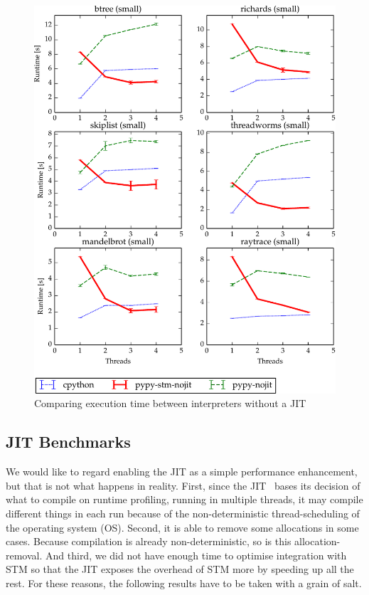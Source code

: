 \documentclass{sigplanconf}
\begin{document}
\begin{figure}[h]
  \centering
  \includegraphics[width=1\columnwidth]{plots/performance_nojit.pdf}
  \caption{Comparing execution time between interpreters without a JIT\label{fig:performance-nojit}}
\end{figure}



\subsection{JIT Benchmarks\label{subsec:jit-benchs}}

We would like to regard enabling the JIT as a simple performance
enhancement, but that is not what happens in reality. First, since the
JIT~\cite{cfbolz09} bases its decision of what to compile on runtime
profiling, running in multiple threads, it may compile different
things in each run because of the non-deterministic thread-scheduling
of the operating system (OS). Second, it is able to remove some
allocations in some cases. Because compilation is already
non-deterministic, so is this allocation-removal. And third, we did
not have enough time to optimise integration with STM so that the JIT
exposes the overhead of STM more by speeding up all the rest.
For these reasons, the following results have to be taken with a grain
of salt.
\end{document}
